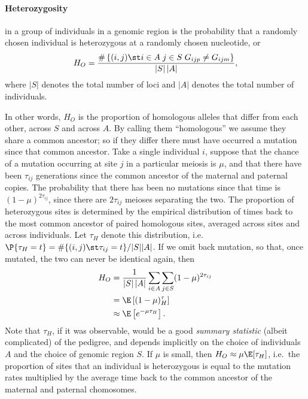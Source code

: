 \paragraph{Heterozygosity} in a group of individuals in a genomic region 
is the probability that a randomly chosen individual is heterozygous at a randomly chosen nucleotide,
or 
\begin{align}
  H_O = \frac{ \# \left\{ (i,j) \st i \in A \; j \in S \; G_{ijp} \neq G_{ijm} \right\} }{ |S|\,|A| } ,
\end{align}
where $|S|$ denotes the total number of loci and $|A|$ denotes the total number of individuals.

In other words, $H_O$ is the proportion of homologous alleles that differ from each other, across $S$ and across $A$.
By calling them ``homologous'' we assume they share a common ancestor;
so if they differ there must have occurred a mutation since that common ancestor.
Take a single individual $i$,
suppose that the chance of a mutation occurring at site $j$ in a particular meiosis is $\mu$,
and that there have been $\tau_{ij}$ generations since the common ancestor of the maternal and paternal copies.
The probability that there has been no mutations since that time is $(1-\mu)^{2 \tau_{ij}}$,
since there are $2 \tau_{ij}$ meioses separating the two.
The proportion of heterozygous sites is determined by the empirical distribution 
of times back to the most common ancestor of paired homologous sites, averaged across sites and across individuals.
Let $\tau_H$ denote this distribution, i.e.\ $\P\{ \tau_H = t \} = \#\{ (i,j) \st \tau_{ij} = t \} / |S||A|$.
If we omit back mutation, so that, once mutated, the two can never be identical again,
then
\begin{align}
  H_O &= \frac{1}{|S|\,|A|} \sum_{i \in A} \sum_{j \in S} (1-\mu)^{2 \tau_{ij}} \\
    &= \E\left[ (1-\mu)^\tau_H \right] \\
    &\approx \E\left[ e^{-\mu \tau_H } \right] .
\end{align}
Note that $\tau_H$, if it was observable, would be a good \emph{summary statistic} (albeit complicated) of the pedigree,
and depends implicitly on the choice of individuals $A$ and the choice of genomic region $S$.
If $\mu$ is small, then $H_O \approx \mu \E[ \tau_H ]$,
i.e.\ the proportion of sites that an individual is heterozygous
is equal to the mutation rates multiplied by the average time back to the common ancestor of the maternal and paternal chomosomes.



